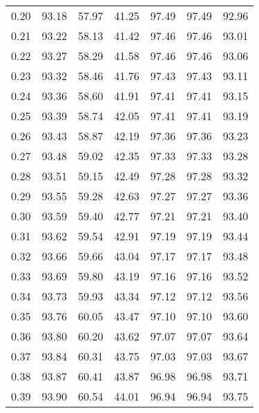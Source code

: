 \begin{tabular}{|c|c|c|c|c|c|c|}
      0.20 &     93.18 &     57.97 &      41.25 &   97.49 &      97.49 &         92.96 \\
      0.21 &     93.22 &     58.13 &      41.42 &   97.46 &      97.46 &         93.01 \\
      0.22 &     93.27 &     58.29 &      41.58 &   97.46 &      97.46 &         93.06 \\
      0.23 &     93.32 &     58.46 &      41.76 &   97.43 &      97.43 &         93.11 \\
      0.24 &     93.36 &     58.60 &      41.91 &   97.41 &      97.41 &         93.15 \\
      0.25 &     93.39 &     58.74 &      42.05 &   97.41 &      97.41 &         93.19 \\
      0.26 &     93.43 &     58.87 &      42.19 &   97.36 &      97.36 &         93.23 \\
      0.27 &     93.48 &     59.02 &      42.35 &   97.33 &      97.33 &         93.28 \\
      0.28 &     93.51 &     59.15 &      42.49 &   97.28 &      97.28 &         93.32 \\
      0.29 &     93.55 &     59.28 &      42.63 &   97.27 &      97.27 &         93.36 \\
      0.30 &     93.59 &     59.40 &      42.77 &   97.21 &      97.21 &         93.40 \\
      0.31 &     93.62 &     59.54 &      42.91 &   97.19 &      97.19 &         93.44 \\
      0.32 &     93.66 &     59.66 &      43.04 &   97.17 &      97.17 &         93.48 \\
      0.33 &     93.69 &     59.80 &      43.19 &   97.16 &      97.16 &         93.52 \\
      0.34 &     93.73 &     59.93 &      43.34 &   97.12 &      97.12 &         93.56 \\
      0.35 &     93.76 &     60.05 &      43.47 &   97.10 &      97.10 &         93.60 \\
      0.36 &     93.80 &     60.20 &      43.62 &   97.07 &      97.07 &         93.64 \\
      0.37 &     93.84 &     60.31 &      43.75 &   97.03 &      97.03 &         93.67 \\
      0.38 &     93.87 &     60.41 &      43.87 &   96.98 &      96.98 &         93.71 \\
      0.39 &     93.90 &     60.54 &      44.01 &   96.94 &      96.94 &         93.75 \\

\end{tabular}
